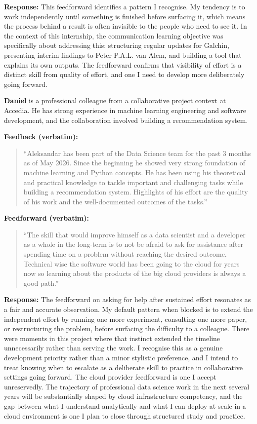 \documentclass[11pt,a4paper]{report}
\begin{document}
\textbf{Response:} This feedforward identifies a pattern I recognise. My tendency is to work
independently until something is finished before surfacing it, which means the process behind a
result is often invisible to the people who need to see it. In the context of this internship, the
communication learning objective was specifically about addressing this: structuring regular updates
for Galchin, presenting interim findings to Peter P.A.L. van Alem, and building a tool that explains its own
outputs. The feedforward confirms that visibility of effort is a distinct skill from quality of
effort, and one I need to develop more deliberately going forward.

\bigskip

\textbf{Daniel} is a professional colleague from a collaborative project context at Accedia. He has
strong experience in machine learning engineering and software development, and the collaboration
involved building a recommendation system.

\textbf{Feedback (verbatim):}

\begin{quote}
``Aleksandar has been part of the Data Science team for the past 3 months as of May 2026. Since the beginning he showed very strong foundation of machine learning and Python concepts. He has been using his theoretical and practical knowledge to tackle important and challenging tasks while building a recommendation system. Highlights of his effort are the quality of his work and the well-documented outcomes of the tasks.''
\end{quote}

\textbf{Feedforward (verbatim):}

\begin{quote}
``The skill that would improve himself as a data scientist and a developer as a whole in the long-term is to not be afraid to ask for assistance after spending time on a problem without reaching the desired outcome. Technical wise the software world has been going to the cloud for years now so learning about the products of the big cloud providers is always a good path.''
\end{quote}

\textbf{Response:} The feedforward on asking for help after sustained effort resonates as a fair
and accurate observation. My default pattern when blocked is to extend the independent effort by running one more
experiment, consulting one more paper, or restructuring the problem, before surfacing the
difficulty to a colleague. There were moments in this project where that instinct
extended the timeline unnecessarily rather than serving the work. I recognise this as a genuine
development priority rather than a minor stylistic preference, and I intend to treat knowing when
to escalate as a deliberate skill to practice in collaborative settings going forward. The cloud
provider feedforward is one I accept unreservedly. The trajectory of professional data science work
in the next several years will be substantially shaped by cloud infrastructure competency, and the
gap between what I understand analytically and what I can deploy at scale in a cloud environment
is one I plan to close through structured study and practice.
\end{document}
